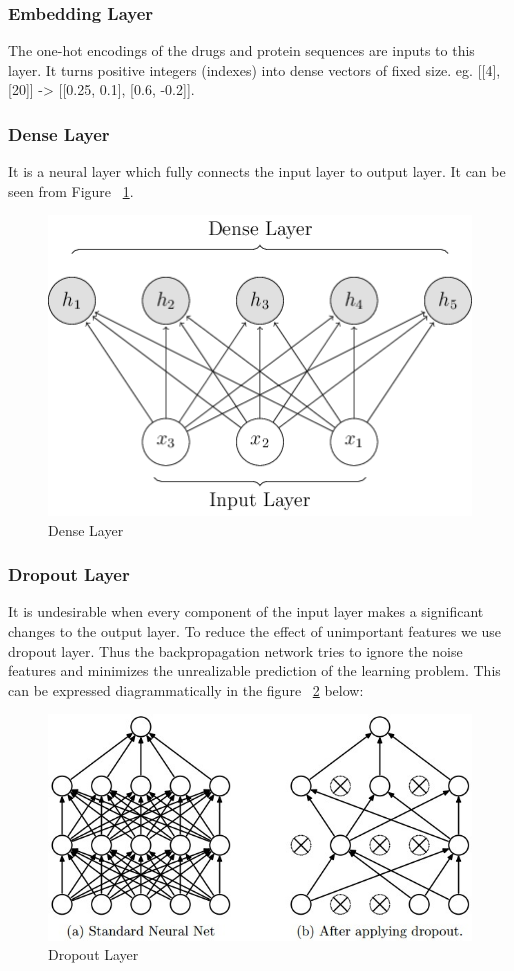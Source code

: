 \subsubsection{Embedding Layer}
The one-hot encodings of the drugs and protein sequences are inputs to this layer. It turns positive integers (indexes) into dense vectors of fixed size. eg. [[4], [20]] -> [[0.25, 0.1], [0.6, -0.2]].

\subsubsection{Dense Layer}
It is a neural layer which fully connects the input layer to output layer. It can be seen from Figure ~\ref{fig:dense}.
\begin{figure}[ht]
  \centering
  \includegraphics[width=.5\linewidth]{mainmatter/3-Methodology/images/dense.png}
  \caption{Dense Layer}
  \label{fig:dense}
\end{figure}

\subsubsection{Dropout Layer}
It is undesirable when every component of the input layer makes a significant changes to the output layer. To reduce the effect of unimportant features we use dropout layer. Thus the backpropagation network tries to ignore the noise features and minimizes the unrealizable prediction of the learning problem. This can be expressed diagrammatically in the figure ~\ref{fig:dropout} below:
\begin{figure}
  [ht] \centering
  \includegraphics[width=.5\linewidth]{mainmatter/3-Methodology/images/dropout.jpeg}
  \caption[]{Dropout Layer}
  \label{fig:dropout}

\end{figure}

